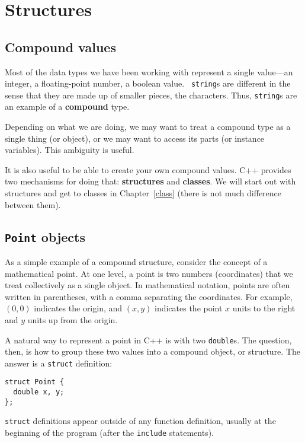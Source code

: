 


\chapter{Structures}
\label{structs}

\section{Compound values}

Most of the data types we have been working with represent a single
value---an integer, a floating-point number, a boolean value.  {\tt
string}s are different in the sense that they are made up of smaller
pieces, the characters.  Thus, {\tt string}s are an example of a
{\bf compound} type.

Depending on what we are doing, we may want to treat a compound type
as a single thing (or object), or we may want to access its parts (or
instance variables).  This ambiguity is useful.

It is also useful to be able to create your own compound values.  C++
provides two mechanisms for doing that: {\bf structures} and {\bf
classes}.  We will start out with structures and get to classes in
Chapter~\ref{class} (there is not much difference between them).

\section{{\tt Point} objects}

As a simple example of a compound structure, consider the concept of a
mathematical point.  At one level, a point is two numbers
(coordinates) that we treat collectively as a single object.  In
mathematical notation, points are often written in parentheses, with a
comma separating the coordinates.  For example, $(0, 0)$ indicates the
origin, and $(x, y)$ indicates the point $x$ units to the right and
$y$ units up from the origin.

A natural way to represent a point in C++ is with two {\tt double}s.
The question, then, is how to group these two values into
a compound object, or structure.  The answer is a {\tt struct}
definition:

\begin{verbatim}
struct Point {
  double x, y;
};  
\end{verbatim}
%
{\tt struct} definitions appear outside of any function definition,
usually at the beginning of the program (after the {\tt include}
statements).

